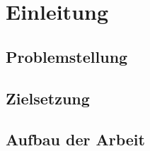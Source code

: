 \newpage
\section{Einleitung}
\subsection{Problemstellung}
\subsection{Zielsetzung}
\subsection{Aufbau der Arbeit}
